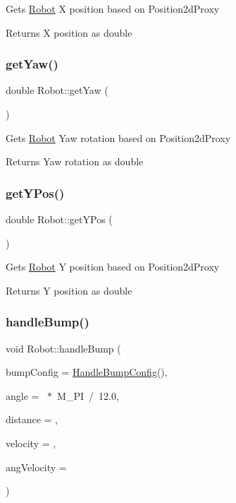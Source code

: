 Gets \hyperlink{classRobot}{Robot} X position based on Position2d\+Proxy \begin{DoxyReturn}{Returns}
X position as double 
\end{DoxyReturn}
\mbox{\label{classRobot_a30cfb16f262020569b21780eecadf4ae}} 
\subsubsection{\texorpdfstring{get\+Yaw()}{getYaw()}}
{\footnotesize\ttfamily double Robot\+::get\+Yaw (\begin{DoxyParamCaption}{ }\end{DoxyParamCaption})}

Gets \hyperlink{classRobot}{Robot} Yaw rotation based on Position2d\+Proxy \begin{DoxyReturn}{Returns}
Yaw rotation as double 
\end{DoxyReturn}
\mbox{\label{classRobot_a60b83b42a3e08af931709a526632fb6d}} 
\subsubsection{\texorpdfstring{get\+Y\+Pos()}{getYPos()}}
{\footnotesize\ttfamily double Robot\+::get\+Y\+Pos (\begin{DoxyParamCaption}{ }\end{DoxyParamCaption})}

Gets \hyperlink{classRobot}{Robot} Y position based on Position2d\+Proxy \begin{DoxyReturn}{Returns}
Y position as double 
\end{DoxyReturn}
\mbox{\label{classRobot_a1b6e28d4eba7ff9e911bd544e24e3f9b}} 
\subsubsection{\texorpdfstring{handle\+Bump()}{handleBump()}}
{\footnotesize\ttfamily void Robot\+::handle\+Bump (\begin{DoxyParamCaption}\item[{\hyperlink{structHandleBumpConfig}{Handle\+Bump\+Config}}]{bump\+Config = {\ttfamily \hyperlink{structHandleBumpConfig}{Handle\+Bump\+Config}()},  }\item[{double}]{angle = {~$\ast$~M\+\_\+PI~/~12.0},  }\item[{double}]{distance = {},  }\item[{double}]{velocity = {},  }\item[{double}]{ang\+Velocity = {} }\end{DoxyParamCaption})}

